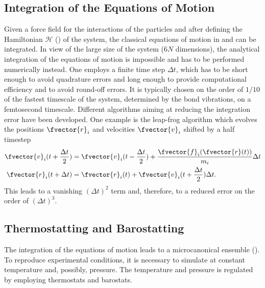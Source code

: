 \subsection{Integration of the Equations of Motion}
%
Given a force field for the interactions of the particles
and after defining the Hamiltonian $\mathcal{H}$ () of the system,
the classical equations of motion in  and  can be integrated.
%
In view of the large size of the system ($6N$ dimensions), the analytical
integration of the equations of motion is impossible and has to be performed
numerically instead.
%
One employs a finite time step $\Delta t$, which has to be 
short enough to avoid 
quadrature errors and long enough to provide computational
efficiency and to avoid round-off errors. It is typically chosen on the
order of $1/10$ of the fastest timescale of the system, determined by the
bond vibrations, on a femtosecond timescale.
%
Different algorithms aiming at reducing the integration error have been developed.
One example is the leap-frog algorithm\cite{HO70.1} which evolves the positions $\fvector{r}_i$ and 
velocities $\fvector{v}_i$ shifted by a half timestep
%
\begin{align}
 \fvector{v}_i(t + \frac{\Delta t}{2}) &= \fvector{v}_i(t - \frac{\Delta t}{2}) 
                                        + \frac{\fvector{f}_i (\fvector{r}(t))}{m_i} \Delta t \\
 \fvector{r}_i(t + \Delta t) &= \fvector{r}_i(t) + \fvector{v}_i (t + \frac{\Delta t}{2}) \Delta t .
\end{align}
%
This leads to a vanishing $(\Delta t)^2$ term and, therefore, to a reduced error 
on the order of $(\Delta t)^3$.



\subsection{Thermostatting and Barostatting}
%
The integration of the equations of motion
leads to a microcanonical ensemble ().
%
To reproduce experimental conditions, it is necessary to simulate 
at constant temperature and, possibly, pressure. 
%
The temperature and pressure is regulated by employing thermostats and barostats.

